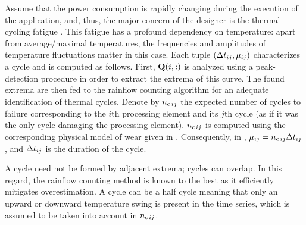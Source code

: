 Assume that the power consumption is rapidly changing during the execution of the application, and, thus, the major concern of the designer is the thermal-cycling fatigue \cite{jedec2011}.
This fatigue has a profound dependency on temperature: apart from average/maximal temperatures, the frequencies and amplitudes of temperature fluctuations matter in this case.
Each tuple $(\dt_{ij}, \mu_{ij})$ characterizes a cycle and is computed as follows.
First, $\mQ(i, :)$ is analyzed using a peak-detection procedure in order to extract the extrema of this curve.
The found extrema are then fed to the rainflow counting algorithm \cite{xiang2010} for an adequate identification of thermal cycles.
Denote by $\ncycles[ij]$ the expected number of cycles to failure corresponding to the $i$th processing element and its $j$th cycle (as if it was the only cycle damaging the processing element).
$\ncycles[ij]$ is computed using the corresponding physical model of wear given in \cite{jedec2011, xiang2010}.
Consequently, in , $\mu_{ij} = \ncycles[ij] \dt_{ij}$, and $\dt_{ij}$ is the duration of the cycle.
\begin{remark} 
A cycle need not be formed by adjacent extrema; cycles can overlap.
In this regard, the rainflow counting method is known to the best as it efficiently mitigates overestimation.
A cycle can be a half cycle meaning that only an upward or downward temperature swing is present in the time series, which is assumed to be taken into account in $\ncycles[ij]$.
\end{remark}

